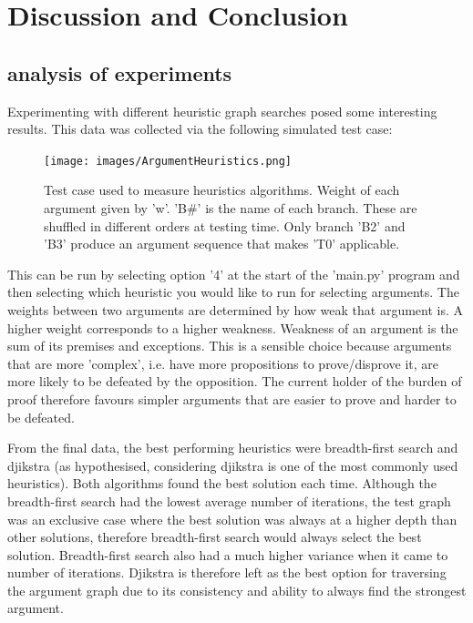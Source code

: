 \documentclass[10pt,a4paper,twocolumn]{article}
\begin{document}
\clearpage{}

\section{Discussion and Conclusion}

\subsection{analysis of experiments}
Experimenting with different heuristic graph searches posed some interesting
results. This data was collected via the following simulated test case:

\begin{figure}[h!]
	\label{ArgumentHeuristics}
	\texttt{[image: images/ArgumentHeuristics.png]}
	\centering
	\caption{Test case used to measure heuristics algorithms. Weight of each
	argument given by 'w'. 'B\#' is the name of each branch. These are shuffled
	in different orders at testing time. Only branch 'B2' and 'B3' produce an
argument sequence that makes 'T0' applicable.}
\end{figure}
This can be run by selecting option '4' at the start of the 'main.py'
program and then selecting which heuristic you would like to run for selecting
arguments. The weights between two arguments are determined by how weak that
argument is. A higher weight corresponds to a higher weakness. Weakness of an
argument is the sum of its premises and exceptions. This is a sensible choice
because arguments that are more 'complex', i.e. have more propositions to
prove/disprove it, are more likely to be defeated by the opposition. The current
holder of the burden of proof therefore favours simpler arguments that are
easier to prove and harder to be defeated.

From the final data, the best performing heuristics were
breadth-first search and djikstra (as hypothesised, considering djikstra is one of
the most commonly used heuristics). Both algorithms found the
best solution each time. Although the breadth-first search had the lowest
average number of iterations, the test graph was an exclusive case where
the best solution was always at a higher depth than other solutions, therefore
breadth-first search would always select the best solution. Breadth-first search
also had a much higher variance when it came to number of iterations.
Djikstra is therefore left as the best option for traversing the
argument graph due to its consistency and ability to always find the strongest
argument.
\end{document}

